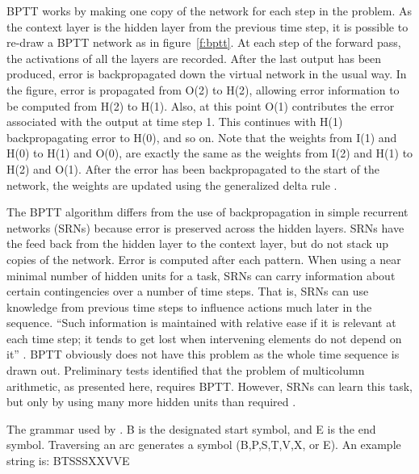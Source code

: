 BPTT works by making one copy of the network for each step in the problem.
As the context layer is the hidden layer from the previous time step, it is
possible to re-draw a BPTT network as in figure~\ref{f:bptt}.  At each step
of the forward pass, the activations of all the layers are recorded.
 After the last output has been
produced, error is backpropagated down the virtual network in the usual
way.  In the figure, error is propagated from O(2) to H(2), allowing
error information to be computed from H(2) to H(1).  Also, at this point
O(1) contributes the error associated with the output at time step 1.
This continues with
H(1) backpropagating error to H(0), and so on.  Note that the weights from
I(1) and H(0) to H(1) and O(0), are exactly the same as the weights from
I(2) and H(1) to H(2) and O(1).  After the error has been backpropagated to
the start of the network, the weights are updated using the generalized
delta rule \cite{pdp:8}.

The BPTT algorithm differs from the use of backpropagation in
simple recurrent networks (SRNs) because error is preserved across the
hidden layers.  SRNs \cite<as described by>{elmafind} have the feed back
from the hidden layer to the context layer, but do not stack up copies of
the network.  Error is computed after each pattern.  When using a near
minimal number of hidden units for a task, SRNs can carry information about
certain contingencies over a number of time steps. That is,
SRNs can use knowledge from previous time steps to influence actions much
later in the
sequence. ``Such information is maintained with relative ease if it is
relevant at each time step; it tends to get lost when intervening elements
do not depend on it'' \cite[p.~372]{cleefini}.  BPTT obviously does not
have this problem as the whole time sequence is drawn out.  Preliminary
tests identified that the problem of multicolumn arithmetic, as presented
here, requires BPTT\@. However, SRNs can learn this task, but only by using
many more hidden units than required \cite{maskforc}.

\begin{fancyfigure}
\centerline{}
\caption{The grammar used by \protect{}.
B is the designated start symbol, and E is the end symbol. Traversing an
arc generates a symbol (B,P,S,T,V,X, or E). An example string is:
BTSSSXXVVE}
\label{f:gram}
\end{fancyfigure}


